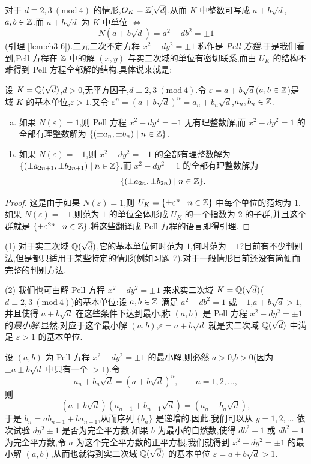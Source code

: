 \begin{sloppypar}
对于 $d\equiv 2,3\ (\mathrm{mod}\ 4)$ 的情形,$O_K=\mathbb{Z}[\sqrt{d}]$.从而 $K$ 中整数可写成 $a+b\sqrt{d}$,$a,b\in\mathbb{Z}$.而 $a+b\sqrt{d}$ 为 $K$ 中单位 $\Leftrightarrow$
\[
  N(a+b\sqrt{d})=a^2-db^2=\pm 1
\]
(引理 \ref{lem:ch3-6}).二元二次不定方程 $x^2-dy^2=\pm 1$ 称作是 \emph{Pell 方程}.于是我们看到,Pell 方程在 $\mathbb{Z}$ 中的解 $(x,y)$ 与实二次域的单位有密切联系,而由 $U_K$ 的结构不难得到 Pell 方程全部解的结构.具体说来就是:
\end{sloppypar}

\begin{lemma}\label{lem:ch3-10}
设 $K=\mathbb{Q}(\sqrt{d})$,$d>0$,无平方因子,$d\equiv 2,3\ (\mathrm{mod}\ 4)$.令 $\varepsilon=a+b\sqrt{d}$($a,b\in\mathbb{Z}$)是域 $K$ 的基本单位,$\varepsilon>1$.又令 $\varepsilon^n=(a+b\sqrt{d})^n=a_n+b_n\sqrt{d}$,$a_n,b_n\in\mathbb{Z}$.
\begin{enumerate}[(a)]
  \item 如果 $N(\varepsilon)=1$,则 Pell 方程 $x^2-dy^2=-1$ 无有理整数解,而 $x^2-dy^2=1$ 的全部有理整数解为 $\{(\pm a_n,\pm b_n)\mid n\in\mathbb{Z}\}$.
  \item 如果 $N(\varepsilon)=-1$,则 $x^2-dy^2=-1$ 的全部有理整数解为 $\{(\pm a_{2n+1},\pm b_{2n+1})\mid n\in\mathbb{Z}\}$,而 $x^2-dy^2=1$ 的全部有理整数解为
  \[
    \{(\pm a_{2n},\pm b_{2n})\mid n\in\mathbb{Z}\}.
  \]
\end{enumerate}
\end{lemma}

\begin{proof}
这是由于如果 $N(\varepsilon)=1$,则 $U_K=\{\pm\varepsilon^n\mid n\in\mathbb{Z}\}$ 中每个单位的范均为 $1$.如果 $N(\varepsilon)=-1$,则范为 $1$ 的单位全体形成 $U_K$ 的一个指数为 $2$ 的子群,并且这个群就是 $\{\pm\varepsilon^{2n}\mid n\in\mathbb{Z}\}$.将这些翻译成 Pell 方程的语言即得引理.
\end{proof}

\begin{remark}
(1) 对于实二次域 $\mathbb{Q}(\sqrt{d})$,它的基本单位何时范为 $1$,何时范为 $-1$?目前有不少判别法,但是都只适用于某些特定的情形(例如习题 7).对于一般情形目前还没有简便而完整的判别方法.

(2) 我们也可由解 Pell 方程 $x^2-dy^2=\pm 1$ 来求实二次域 $K=\mathbb{Q}(\sqrt{d})$($d\equiv 2,3\ (\mathrm{mod}\ 4)$)的基本单位:设 $a,b\in\mathbb{Z}$ 满足 $a^2-db^2=1$ 或 $-1$,$a+b\sqrt{d}>1$,并且使得 $a+b\sqrt{d}$ 在这些条件下达到最小,称 $(a,b)$ 是 Pell 方程 $x^2-dy^2=\pm 1$ 的\emph{最小解}.显然,对应于这个最小解 $(a,b)$,$\varepsilon=a+b\sqrt{d}$ 就是实二次域 $\mathbb{Q}(\sqrt{d})$ 中满足 $\varepsilon>1$ 的基本单位.

设 $(a,b)$ 为 Pell 方程 $x^2-dy^2=\pm 1$ 的最小解,则必然 $a>0$,$b>0$(因为 $\pm a\pm b\sqrt{d}$ 中只有一个 $>1$).令
\[
  a_n+b_n\sqrt{d}=(a+b\sqrt{d})^n,\qquad n=1,2,\dots,
\]
则
\[
  (a+b\sqrt{d})(a_{n-1}+b_{n-1}\sqrt{d})=(a_n+b_n\sqrt{d}),
\]
于是 $b_n=ab_{n-1}+ba_{n-1}$,从而序列 $\{b_n\}$ 是递增的.因此,我们可以从 $y=1,2,\dots$ 依次试验 $dy^2\pm 1$ 是否为完全平方数.如果 $b$ 为最小的自然数,使得 $db^2+1$ 或 $db^2-1$ 为完全平方数,令 $a$ 为这个完全平方数的正平方根,我们就得到 $x^2-dy^2=\pm 1$ 的最小解 $(a,b)$,从而也就得到实二次域 $\mathbb{Q}(\sqrt{d})$ 的基本单位 $\varepsilon=a+b\sqrt{d}>1$.
\end{remark}

